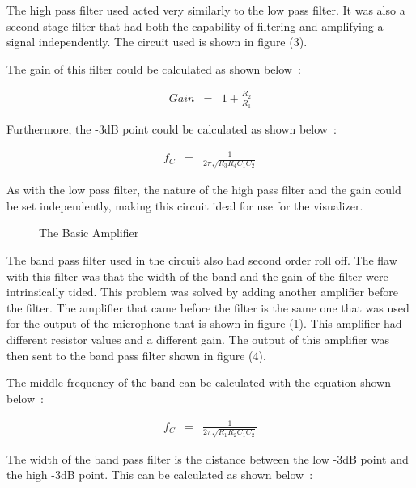 \documentclass{article}
\begin{document}
The high pass filter used acted very similarly to the low pass filter. It was also a second stage filter that had both the capability of filtering and amplifying a signal independently. The circuit used is shown in figure (3).~\cite{High}

The gain of this filter could be calculated as shown below~\cite{High}:

\begin{eqnarray}
Gain &=& 1 + \frac{R_2}{R_1} 
\end{eqnarray}

Furthermore, the -3dB point could be calculated as shown below~\cite{High}:

\begin{eqnarray}
f_C &=& \frac{1}{2\pi \sqrt{R_3R_4C_1C_2}}
\end{eqnarray}

As with the low pass filter, the nature of the high pass filter and the gain could be set independently, making this circuit ideal for use for the visualizer.

\begin{figure}
\begin{minipage}[b]{1.0\linewidth}
  \centering
  \centerline{}
\caption{The Basic Amplifier}
\end{minipage}

\end{figure}

The band pass filter used in the circuit also had second order roll off. The flaw with this filter was that the width of the band and the gain of the filter were intrinsically tided. This problem was solved by adding another amplifier before the filter. The amplifier that came before the filter is the same one that was used for the output of the microphone that is shown in figure (1). This amplifier had different resistor values and a different gain. The output of this amplifier was then sent to the band pass filter shown in figure (4).~\cite{Band}



The middle frequency of the band can be calculated with the equation shown below~\cite{Band}:

\begin{eqnarray}
f_C &=& \frac{1}{2\pi \sqrt{R_1R_2C_1C_2}}
\end{eqnarray}

The width of the band pass filter is the distance between the low -3dB point and the high -3dB point. This can be calculated as shown below~\cite{Band}:
\end{document}
